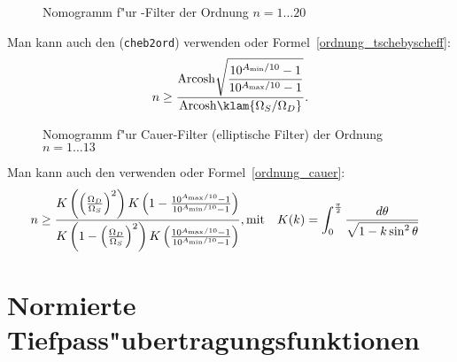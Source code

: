 \clearpage
\begin{figure}[!htb]%
\begin{center}\vspace*{-5.5mm}\hspace*{-5mm}
  \vspace*{-1.7cm}\caption{Nomogramm f"ur -Filter der Ordnung $n=1\ldots 20$\label{nomo-Tsche}}
\end{center}
\end{figure}
\vspace*{-0.7cm}\nit Man kann auch den  ({\tt cheb2ord}) verwenden oder Formel~\ref{ordnung_tschebyscheff}:
{\footnotesize
\begin{equation*}
n\geq\frac{{\rm Arcosh}\sqrt{\displaystyle\frac{10^{A_{\min}/10}-1}
{10^{A_{\max}/10}-1}}}{{\rm Arcosh}\klam{\Omega_{S}/\Omega_{D}}}.
\end{equation*}}
\clearpage
\begin{figure}[!htb]%
\begin{center}
\vspace*{-5.5mm}\hspace*{-7mm}
  \vspace*{-1.7cm}\caption{Nomogramm f"ur Cauer-Filter (elliptische Filter) der Ordnung $n=1\ldots 13$\label{nomo-CC}}
\end{center}
\end{figure}
\vspace*{-0.7cm}\nit Man kann auch den  verwenden oder Formel~\ref{ordnung_cauer}:
{\footnotesize\begin{equation*}
\hspace*{-3mm}n\geq\frac{K\left(\left( \frac{\Omega_D}{\Omega_S}\right)^2\right)  K\left(1-\frac{10^{A_{\max}/10}-1}{10^{A_{\min}/10}-1}\right) } {K\left(1-\left(\frac{\Omega_D}{\Omega_S}\right)^2\right )K\left(\frac{10^{A_{\max}/10}-1}{10^{A_{\min}/10}-1} \right)},\text{mit}\quad K(k)=\int_0^{\frac{\pi}{2}}\frac{d\theta}{\sqrt{1-k\sin^2\theta}}
\end{equation*}}
\section{Normierte Tiefpass"ubertragungsfunktionen}
